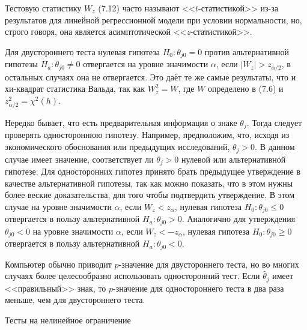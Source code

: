 Тестовую статистику $W_z$ (7.12) часто называют <<$t$-статистикой>> из-за результатов для линейной регрессионной модели при условии нормальности, но, строго говоря, она является асимптотической <<$z$-статистикой>>.

Для двустороннего теста нулевая гипотеза $H_0: \theta_{j0} = 0$ против альтернативной гипотезы $H_a: \theta_{j0} \not= 0$ отвергается на уровне значимости $\alpha$, если $|W_z| > z_{\alpha/2}$, в остальных случаях она не отвергается. Это даёт те же самые результаты, что и хи-квадрат статистика Вальда, так как $W_z^2 = W$, где $W$ определено в (7.6) и $z^2_{\alpha/2} = \chi^2(h)$.

Нередко бывает, что есть предварительная информация о знаке $\theta_j$. Тогда следует проверять одностороннюю гипотезу. Например, предположим, что, исходя из экономического обоснования или предыдущих исследований, $\theta_j > 0$. В данном случае имеет значение, соответствует ли $\theta_j > 0$ нулевой или альтернативной гипотезе. Для односторонних гипотез принято брать предыдущее утверждение в качестве альтернативной гипотезы, так как можно показать, что в этом нужны более веские доказательства, для того чтобы подтвердить утверждение. В этом случае на уровне значимости $\alpha$, если $W_z < z_{\alpha}$, нулевая гипотеза $H_0: \theta_{j0} \leq 0$ отвергается в пользу альтернативной $H_a: \theta_{j0} > 0$. Аналогично для утверждения $\theta_{j0} < 0$ на уровне значимости $\alpha$, если $W_z < - z_{\alpha}$, нулевая гипотеза $H_0: \theta_{j0} \geq 0$ отвергается в пользу альтернативной $H_a: \theta_{j0} < 0$.

Компьютер обычно приводит $p$-значение для двустороннего теста, но во многих случаях более целесообразно использовать односторонний тест. Если $\hat{\theta}_j$ имеет <<правильный>> знак, то $p$-значение для одностороннего теста в два раза меньше, чем для двустороннего теста.

\begin{center}
Тесты на нелинейное ограничение
\end{center}

